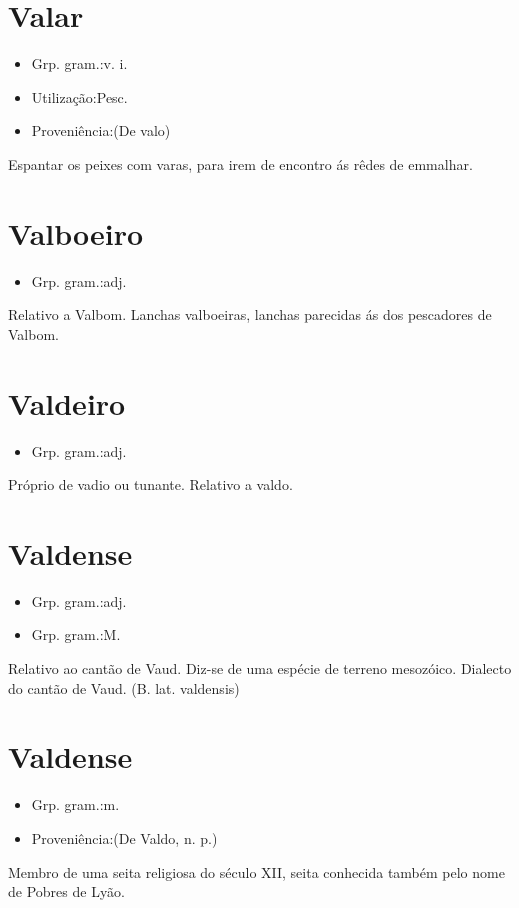 \documentclass{article}
\begin{document}
\section{Valar}
\begin{itemize}
\item {Grp. gram.:v. i.}
\end{itemize}
\begin{itemize}
\item {Utilização:Pesc.}
\end{itemize}
\begin{itemize}
\item {Proveniência:(De \textunderscore valo\textunderscore )}
\end{itemize}
Espantar os peixes com varas, para irem de encontro ás rêdes de emmalhar.
\section{Valboeiro}
\begin{itemize}
\item {Grp. gram.:adj.}
\end{itemize}
Relativo a Valbom.
\textunderscore Lanchas valboeiras\textunderscore , lanchas parecidas ás dos pescadores de Valbom.
\section{Valdeiro}
\begin{itemize}
\item {Grp. gram.:adj.}
\end{itemize}
Próprio de vadio ou tunante.
Relativo a valdo.
\section{Valdense}
\begin{itemize}
\item {Grp. gram.:adj.}
\end{itemize}
\begin{itemize}
\item {Grp. gram.:M.}
\end{itemize}
Relativo ao cantão de Vaud.
Diz-se de uma espécie de terreno mesozóico.
Dialecto do cantão de Vaud.
(B. lat. \textunderscore valdensis\textunderscore )
\section{Valdense}
\begin{itemize}
\item {Grp. gram.:m.}
\end{itemize}
\begin{itemize}
\item {Proveniência:(De \textunderscore Valdo\textunderscore , n. p.)}
\end{itemize}
Membro de uma seita religiosa do século XII, seita conhecida também pelo nome de \textunderscore Pobres de Lyão\textunderscore .
\end{document}
